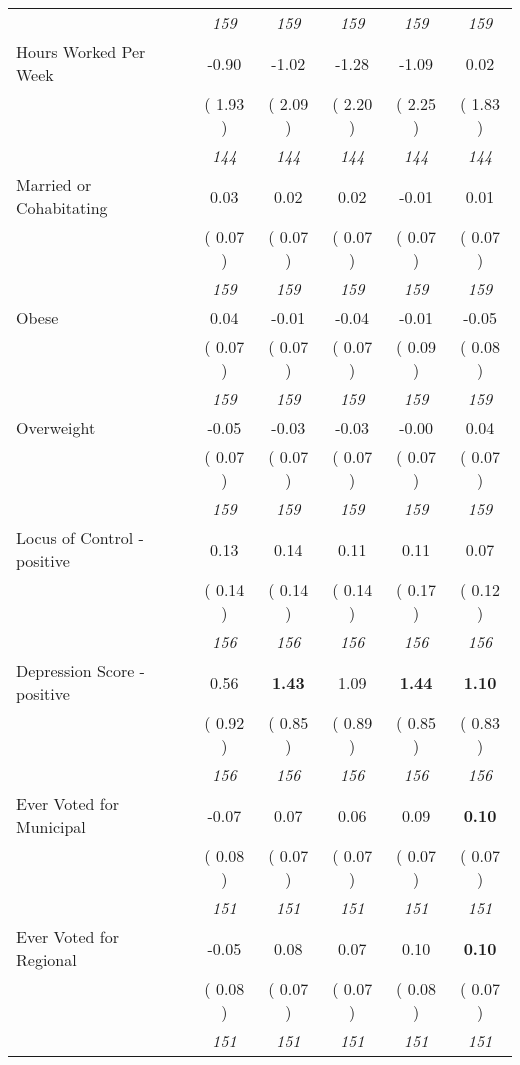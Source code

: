 \begin{tabular}{l c c c c c}
& \textit{ 159 } & \textit{ 159 } & \textit{ 159 } & \textit{ 159 } & \textit{ 159 } \\
Hours Worked Per Week &     -0.90 &     -1.02 &     -1.28 &     -1.09 &      0.02 \\
& (     1.93 ) & (     2.09 ) & (     2.20 ) & (     2.25 ) & (     1.83 ) \\
& \textit{ 144 } & \textit{ 144 } & \textit{ 144 } & \textit{ 144 } & \textit{ 144 } \\
Married or Cohabitating &      0.03 &      0.02 &      0.02 &     -0.01 &      0.01 \\
& (     0.07 ) & (     0.07 ) & (     0.07 ) & (     0.07 ) & (     0.07 ) \\
& \textit{ 159 } & \textit{ 159 } & \textit{ 159 } & \textit{ 159 } & \textit{ 159 } \\
Obese &      0.04 &     -0.01 &     -0.04 &     -0.01 &     -0.05 \\
& (     0.07 ) & (     0.07 ) & (     0.07 ) & (     0.09 ) & (     0.08 ) \\
& \textit{ 159 } & \textit{ 159 } & \textit{ 159 } & \textit{ 159 } & \textit{ 159 } \\
Overweight &     -0.05 &     -0.03 &     -0.03 &     -0.00 &      0.04 \\
& (     0.07 ) & (     0.07 ) & (     0.07 ) & (     0.07 ) & (     0.07 ) \\
& \textit{ 159 } & \textit{ 159 } & \textit{ 159 } & \textit{ 159 } & \textit{ 159 } \\
Locus of Control - positive &      0.13 &      0.14 &      0.11 &      0.11 &      0.07 \\
& (     0.14 ) & (     0.14 ) & (     0.14 ) & (     0.17 ) & (     0.12 ) \\
& \textit{ 156 } & \textit{ 156 } & \textit{ 156 } & \textit{ 156 } & \textit{ 156 } \\
Depression Score - positive &      0.56 & \textbf{      1.43 } &      1.09 & \textbf{     1.44} & \textbf{     1.10} \\
& (     0.92 ) & (     0.85 ) & (     0.89 ) & (     0.85 ) & (     0.83 ) \\
& \textit{ 156 } & \textit{ 156 } & \textit{ 156 } & \textit{ 156 } & \textit{ 156 } \\
Ever Voted for Municipal &     -0.07 &      0.07 &      0.06 &      0.09 & \textbf{     0.10} \\
& (     0.08 ) & (     0.07 ) & (     0.07 ) & (     0.07 ) & (     0.07 ) \\
& \textit{ 151 } & \textit{ 151 } & \textit{ 151 } & \textit{ 151 } & \textit{ 151 } \\
Ever Voted for Regional &     -0.05 &      0.08 &      0.07 &      0.10 & \textbf{     0.10} \\
& (     0.08 ) & (     0.07 ) & (     0.07 ) & (     0.08 ) & (     0.07 ) \\
& \textit{ 151 } & \textit{ 151 } & \textit{ 151 } & \textit{ 151 } & \textit{ 151 } \\
\bottomrule
\end{tabular}

